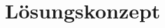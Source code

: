 \documentclass[../main.tex]{subfiles}
\begin{document}
\newpage
\section{Lösungskonzept}
\end{document}
